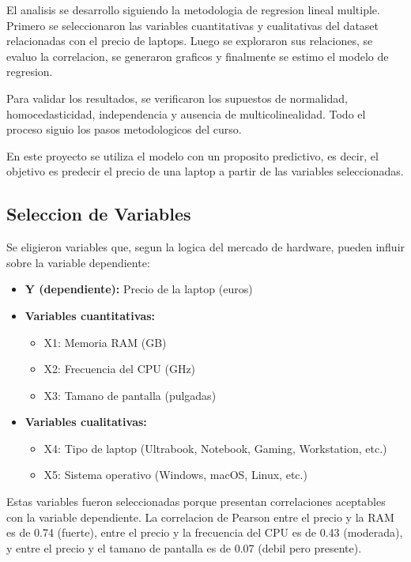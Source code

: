\documentclass[12pt,a4paper]{article}
\begin{document}
El analisis se desarrollo siguiendo la metodologia de regresion lineal multiple. Primero se seleccionaron las variables cuantitativas y cualitativas del dataset relacionadas con el precio de laptops. Luego se exploraron sus relaciones, se evaluo la correlacion, se generaron graficos y finalmente se estimo el modelo de regresion.

Para validar los resultados, se verificaron los supuestos de normalidad, homocedasticidad, independencia y ausencia de multicolinealidad. Todo el proceso siguio los pasos metodologicos del curso.

En este proyecto se utiliza el modelo con un proposito predictivo, es decir, el objetivo es predecir el precio de una laptop a partir de las variables seleccionadas.

\subsection{Seleccion de Variables}

Se eligieron variables que, segun la logica del mercado de hardware, pueden influir sobre la variable dependiente:

\begin{itemize}[leftmargin=2cm]
    \item \textbf{Y (dependiente):} Precio de la laptop (euros)
    
    \item \textbf{Variables cuantitativas:}
    \begin{itemize}
        \item X1: Memoria RAM (GB)
        \item X2: Frecuencia del CPU (GHz)
        \item X3: Tamano de pantalla (pulgadas)
    \end{itemize}
    
    \item \textbf{Variables cualitativas:}
    \begin{itemize}
        \item X4: Tipo de laptop (Ultrabook, Notebook, Gaming, Workstation, etc.)
        \item X5: Sistema operativo (Windows, macOS, Linux, etc.)
    \end{itemize}
\end{itemize}

Estas variables fueron seleccionadas porque presentan correlaciones aceptables con la variable dependiente. La correlacion de Pearson entre el precio y la RAM es de 0.74 (fuerte), entre el precio y la frecuencia del CPU es de 0.43 (moderada), y entre el precio y el tamano de pantalla es de 0.07 (debil pero presente).
\end{document}
